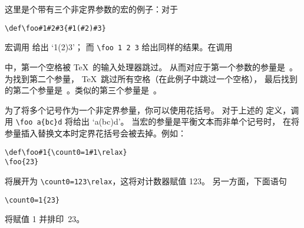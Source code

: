 \documentclass{book}
\begin{document}
这里是个带有三个非定界参数的宏的例子：对于
\begin{verbatim}
\def\foo#1#2#3{#1(#2)#3}
\end{verbatim}
宏调用  给出 `\hbox{1(2)3}'；
而 \hbox{\verb-\foo 1 2 3-} 给出同样的结果。在调用
\begin{disp}\end{disp}
中，第一个空格被 \TeX\ 的输入处理器跳过。
从而对应于第一个参数的参量是~。为找到第二个参量，
\TeX\ 跳过所有空格（在此例子中跳过一个空格），
最后找到的第二个参量是~。类似的第三个参量是~。


为了将多个记号作为一个非定界参量，你可以使用花括号。
对于上述的  定义，调用 \verb>\foo a{bc}d> 将给出 `\hbox{a(bc)d}'。
当宏的参量是平衡文本而非单个记号时，
在将参量插入替换文本时定界花括号会被去掉。例如：
\begin{verbatim}
\def\foo#1{\count0=1#1\relax}
\foo{23}
\end{verbatim}
将展开为 \verb>\count0=123\relax>，这将对计数器赋值 123。
另一方面，下面语句
\begin{verbatim}
\count0=1{23}
\end{verbatim}
将赋值 1 并排印~23。
\end{document}
